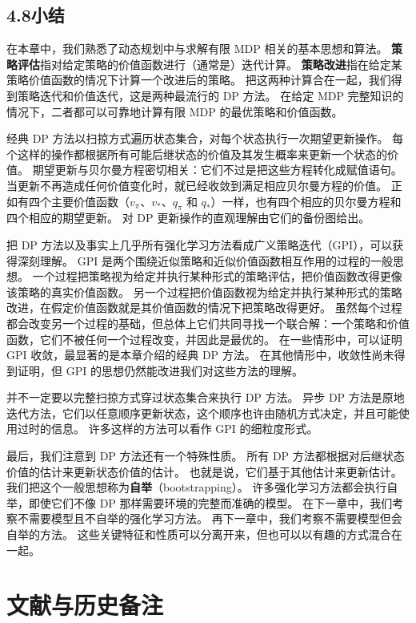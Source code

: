 \documentclass[UTF8,12pt,a4paper,fontset=fandol]{ctexart}
\begin{document}
\subsection*{4.8\quad 小结}

在本章中，我们熟悉了动态规划中与求解有限 MDP 相关的基本思想和算法。
\textbf{策略评估}指对给定策略的价值函数进行（通常是）迭代计算。
\textbf{策略改进}指在给定某策略价值函数的情况下计算一个改进后的策略。
把这两种计算合在一起，我们得到策略迭代和价值迭代，这是两种最流行的 DP 方法。
在给定 MDP 完整知识的情况下，二者都可以可靠地计算有限 MDP 的最优策略和价值函数。

经典 DP 方法以扫掠方式遍历状态集合，对每个状态执行一次期望更新操作。
每个这样的操作都根据所有可能后继状态的价值及其发生概率来更新一个状态的价值。
期望更新与贝尔曼方程密切相关：它们不过是把这些方程转化成赋值语句。
当更新不再造成任何价值变化时，就已经收敛到满足相应贝尔曼方程的价值。
正如有四个主要价值函数（$v_\pi$、$v_*$、$q_\pi$ 和 $q_*$）一样，也有四个相应的贝尔曼方程和四个相应的期望更新。
对 DP 更新操作的直观理解由它们的备份图给出。

把 DP 方法以及事实上几乎所有强化学习方法看成广义策略迭代（GPI），可以获得深刻理解。
GPI 是两个围绕近似策略和近似价值函数相互作用的过程的一般思想。
一个过程把策略视为给定并执行某种形式的策略评估，把价值函数改得更像该策略的真实价值函数。
另一个过程把价值函数视为给定并执行某种形式的策略改进，在假定价值函数就是其价值函数的情况下把策略改得更好。
虽然每个过程都会改变另一个过程的基础，但总体上它们共同寻找一个联合解：一个策略和价值函数，它们不被任何一个过程改变，并因此是最优的。
在一些情形中，可以证明 GPI 收敛，最显著的是本章介绍的经典 DP 方法。
在其他情形中，收敛性尚未得到证明，但 GPI 的思想仍然能改进我们对这些方法的理解。

并不一定要以完整扫掠方式穿过状态集合来执行 DP 方法。
异步 DP 方法是原地迭代方法，它们以任意顺序更新状态，这个顺序也许由随机方式决定，并且可能使用过时的信息。
许多这样的方法可以看作 GPI 的细粒度形式。

最后，我们注意到 DP 方法还有一个特殊性质。
所有 DP 方法都根据对后继状态价值的估计来更新状态价值的估计。
也就是说，它们基于其他估计来更新估计。
我们把这个一般思想称为\textbf{自举}（bootstrapping）。
许多强化学习方法都会执行自举，即使它们不像 DP 那样需要环境的完整而准确的模型。
在下一章中，我们考察不需要模型且不自举的强化学习方法。
再下一章中，我们考察不需要模型但会自举的方法。
这些关键特征和性质可以分离开来，但也可以以有趣的方式混合在一起。

\section*{文献与历史备注}
\end{document}
